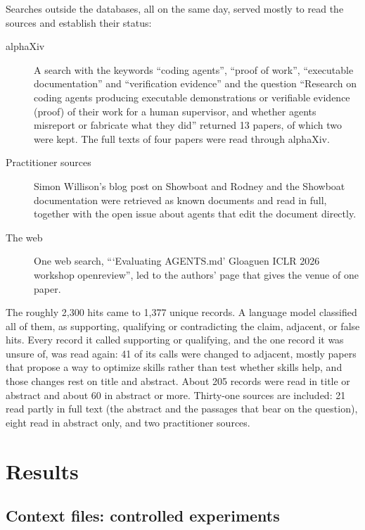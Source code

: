 Searches outside the databases, all on the same day, served mostly to read the
sources and establish their status:
\begin{description}
  \item[alphaXiv] A search with the keywords \enquote{coding agents},
    \enquote{proof of work}, \enquote{executable documentation} and
    \enquote{verification evidence} and the question \enquote{Research on
    coding agents producing executable demonstrations or verifiable evidence
    (proof) of their work for a human supervisor, and whether agents misreport
    or fabricate what they did} returned 13 papers, of which two were
    kept\autocite{smyth2026overclaiming,xu2026ctxgap}.
    The full texts of four papers were read through alphaXiv.
  \item[Practitioner sources] Simon Willison's blog post on Showboat and
    Rodney\autocite{willison2026showboat} and the Showboat
    documentation\autocite{willison2026showboatreadme} were retrieved as known
    documents and read in full, together with the open issue about agents that
    edit the document directly.
  \item[The web] One web search, \enquote{\enquote{Evaluating AGENTS.md}
    Gloaguen ICLR 2026 workshop openreview}, led to the authors' page that
    gives the venue of one paper\autocite{gloaguen2026agentsmd}.
\end{description}

The roughly 2,300 hits came to 1,377 unique records.
A language model classified all of them, as supporting, qualifying or
contradicting the claim, adjacent, or false hits.
Every record it called supporting or qualifying, and the one record it was
unsure of, was read again: 41 of its calls were changed to adjacent, mostly
papers that propose a way to optimize skills rather than test whether skills
help, and those changes rest on title and abstract.
About 205 records were read in title or abstract and about 60 in abstract or
more.
Thirty-one sources are included: 21 read partly in full text (the abstract and
the passages that bear on the question), eight read in abstract only, and two
practitioner sources.

\section{Results}
\label{sec:ai-rq4-results}

\subsection{Context files: controlled experiments}

